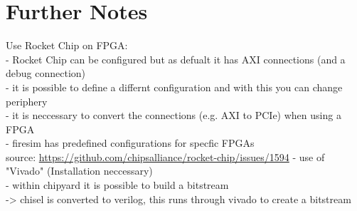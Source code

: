 \documentclass{article}
\begin{document}
{\section*{Further Notes}
Use Rocket Chip on FPGA:\\
- Rocket Chip can be configured but as defualt it has AXI connections (and a debug connection)\\
- it is possible to define a differnt configuration and with this you can change periphery\\
- it is neccessary to convert the connections (e.g. AXI to PCIe) when using a FPGA\\
- firesim has predefined configurations for specfic FPGAs\\
source: \url{https://github.com/chipsalliance/rocket-chip/issues/1594}
- use of "Vivado" (Installation neccessary)\\
- within chipyard it is possible to build a bitstream\\
-> chisel is converted to verilog, this runs through vivado to create a bitstream 
}
\end{document}
